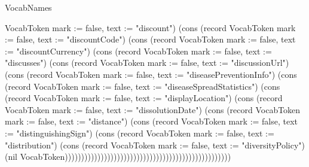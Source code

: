 \begin{lexlean}{VocabNames}
\begin{semanticmodule}
{VocabToken {mark := false, text := "discount"}) (cons (record VocabToken {mark := false, text := "discountCode"}) (cons (record VocabToken {mark := false, text := "discountCurrency"}) (cons (record VocabToken {mark := false, text := "discusses"}) (cons (record VocabToken {mark := false, text := "discussionUrl"}) (cons (record VocabToken {mark := false, text := "diseasePreventionInfo"}) (cons (record VocabToken {mark := false, text := "diseaseSpreadStatistics"}) (cons (record VocabToken {mark := false, text := "displayLocation"}) (cons (record VocabToken {mark := false, text := "dissolutionDate"}) (cons (record VocabToken {mark := false, text := "distance"}) (cons (record VocabToken {mark := false, text := "distinguishingSign"}) (cons (record VocabToken {mark := false, text := "distribution"}) (cons (record VocabToken {mark := false, text := "diversityPolicy"}) (nil VocabToken)))))))))))))))))))))))))))))))))))))))))))))))))))
}


\end{semanticmodule}
\end{lexlean}
